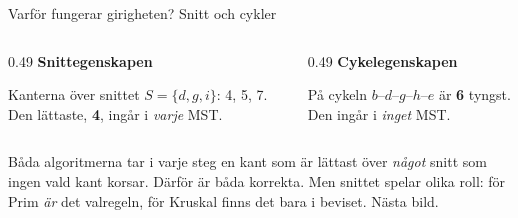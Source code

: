 {\kaninbg
\begin{frame}{\kh Varför fungerar girigheten? Snitt och cykler}
\begin{columns}[T]
\begin{column}{0.49\textwidth}
\centering
{\small\bfseries\color{plum}Snittegenskapen}\par
\par
\footnotesize Kanterna över snittet $S=\{d,g,i\}$: 4, 5, 7.
Den lättaste, \textbf{4}, ingår i \emph{varje} MST.
\end{column}
\begin{column}{0.49\textwidth}
\centering
{\small\bfseries\color{kthgreen}Cykelegenskapen}\par
\par
\footnotesize På cykeln $b$--$d$--$g$--$h$--$e$ är \textbf{6} tyngst.
Den ingår i \emph{inget} MST.
\end{column}
\end{columns}
\vfill
\begin{kaninbox}[fontupper=\footnotesize]
Båda algoritmerna tar i varje steg en kant som är lättast över \emph{något} snitt som ingen vald
kant korsar. Därför är båda korrekta. Men snittet spelar olika roll: för Prim \emph{är} det
valregeln, för Kruskal finns det bara i beviset. Nästa bild.
\end{kaninbox}
\end{frame}}

